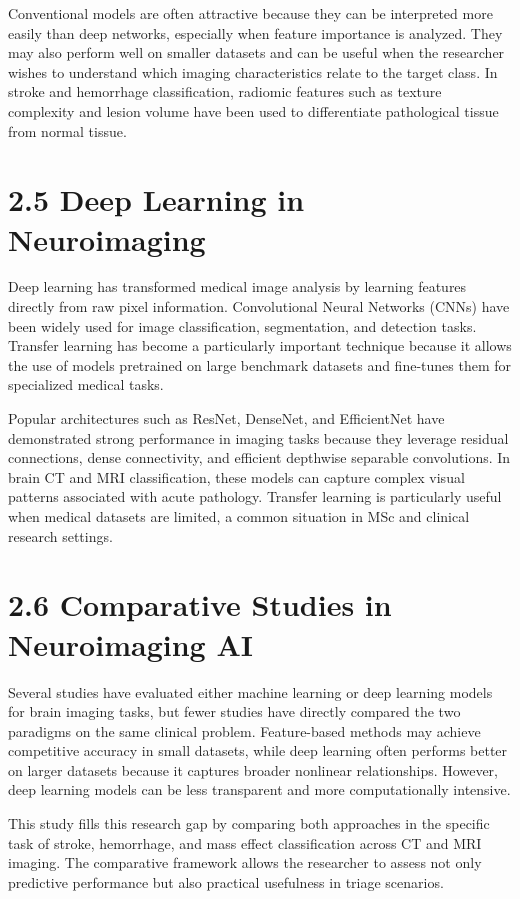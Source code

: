 \documentclass[12pt,a4paper]{report}
\begin{document}
Conventional models are often attractive because they can be interpreted more easily than deep networks, especially when feature importance is analyzed. They may also perform well on smaller datasets and can be useful when the researcher wishes to understand which imaging characteristics relate to the target class. In stroke and hemorrhage classification, radiomic features such as texture complexity and lesion volume have been used to differentiate pathological tissue from normal tissue.

\section{2.5 Deep Learning in Neuroimaging}

Deep learning has transformed medical image analysis by learning features directly from raw pixel information. Convolutional Neural Networks (CNNs) have been widely used for image classification, segmentation, and detection tasks. Transfer learning has become a particularly important technique because it allows the use of models pretrained on large benchmark datasets and fine-tunes them for specialized medical tasks.

Popular architectures such as ResNet, DenseNet, and EfficientNet have demonstrated strong performance in imaging tasks because they leverage residual connections, dense connectivity, and efficient depthwise separable convolutions. In brain CT and MRI classification, these models can capture complex visual patterns associated with acute pathology. Transfer learning is particularly useful when medical datasets are limited, a common situation in MSc and clinical research settings.

\section{2.6 Comparative Studies in Neuroimaging AI}

Several studies have evaluated either machine learning or deep learning models for brain imaging tasks, but fewer studies have directly compared the two paradigms on the same clinical problem. Feature-based methods may achieve competitive accuracy in small datasets, while deep learning often performs better on larger datasets because it captures broader nonlinear relationships. However, deep learning models can be less transparent and more computationally intensive.

This study fills this research gap by comparing both approaches in the specific task of stroke, hemorrhage, and mass effect classification across CT and MRI imaging. The comparative framework allows the researcher to assess not only predictive performance but also practical usefulness in triage scenarios.
\end{document}
